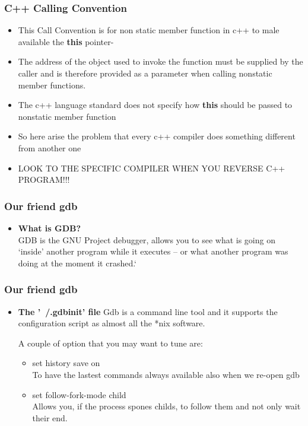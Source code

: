 \documentclass[]{beamer}
\begin{document}
		\begin{frame}
			\frametitle{C++ Calling Convention}
			\begin{itemize}
				\item{This Call Convention is for non static member function in c++ to male available the \textbf{this} pointer-}
				\item{The address of the object used to invoke the function must be supplied by the caller and is therefore provided as a parameter when calling nonstatic member functions.}
				\item{The c++ language standard does not specify how \textbf{this} should be passed to nonstatic member function}
				\item{So here arise the problem that every c++ compiler does something different from another one}
				\item{\color{red} LOOK TO THE SPECIFIC COMPILER WHEN YOU REVERSE C++ PROGRAM!!!}
			\end{itemize}
		\end{frame}
      \begin{frame}
        \frametitle{Our friend gdb}
        \begin{itemize}
            \item{{\bf What is GDB?}\\}
            GDB is the GNU Project debugger, allows you to see what is going on `inside' another program while it executes -- or what another program was doing at the moment it crashed.`
        \end{itemize}
      \end{frame}
      \begin{frame}
        \frametitle{Our friend gdb}
        \begin{itemize}
            \item{{\bf The '~/.gdbinit' file}}
            Gdb is a command line tool and it supports the configuration script as almost all the *nix software.

            A couple of option that you may want to tune are:
            \begin{itemize}
                \item{set history save on}\\
                To have the lastest commands always available also when we re-open gdb
                \item{set follow-fork-mode child}\\
                Allows you, if the process spones childs, to follow them and not only wait their end.
            \end{itemize}
        \end{itemize}
      \end{frame}
\end{document}
